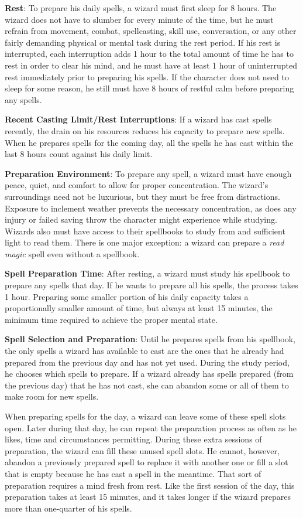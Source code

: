 \textbf{Rest}: To prepare his daily spells, a wizard must first sleep for 8 hours. The wizard does not have to slumber for every minute of the time, but he must refrain from movement, combat, spellcasting, skill use, conversation, or any other fairly demanding physical or mental task during the rest period. If his rest is interrupted, each interruption adds 1 hour to the total amount of time he has to rest in order to clear his mind, and he must have at least 1 hour of uninterrupted rest immediately prior to preparing his spells. If the character does not need to sleep for some reason, he still must have 8 hours of restful calm before preparing any spells. 
				
\textbf{Recent Casting Limit/Rest Interruptions}: If a wizard has cast spells recently, the drain on his resources reduces his capacity to prepare new spells. When he prepares spells for the coming day, all the spells he has cast within the last 8 hours count against his daily limit.
				
\textbf{Preparation Environment}: To prepare any spell, a wizard must have enough peace, quiet, and comfort to allow for proper concentration. The wizard's surroundings need not be luxurious, but they must be free from distractions. Exposure to inclement weather prevents the necessary concentration, as does any injury or failed saving throw the character might experience while studying. Wizards also must have access to their spellbooks to study from and sufficient light to read them. There is one major exception: a wizard can prepare a \textit{read magic }spell even without a spellbook. 
				
\textbf{Spell Preparation Time}: After resting, a wizard must study his spellbook to prepare any spells that day. If he wants to prepare all his spells, the process takes 1 hour. Preparing some smaller portion of his daily capacity takes a proportionally smaller amount of time, but always at least 15 minutes, the minimum time required to achieve the proper mental state.
				
\textbf{Spell Selection and Preparation}: Until he prepares spells from his spellbook, the only spells a wizard has available to cast are the ones that he already had prepared from the previous day and has not yet used. During the study period, he chooses which spells to prepare. If a wizard already has spells prepared (from the previous day) that he has not cast, she can abandon some or all of them to make room for new spells.
				
When preparing spells for the day, a wizard can leave some of these spell slots open. Later during that day, he can repeat the preparation process as often as he likes, time and circumstances permitting. During these extra sessions of preparation, the wizard can fill these unused spell slots. He cannot, however, abandon a previously prepared spell to replace it with another one or fill a slot that is empty because he has cast a spell in the meantime. That sort of preparation requires a mind fresh from rest. Like the first session of the day, this preparation takes at least 15 minutes, and it takes longer if the wizard prepares more than one-quarter of his spells.
				
